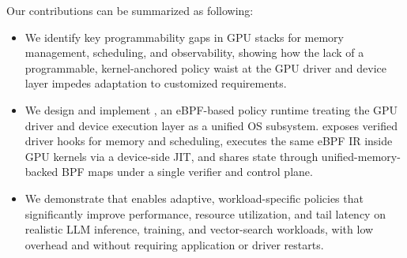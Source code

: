 Our contributions can be summarized as following:

\begin{itemize}[leftmargin=*,itemsep=0pt]
  \item We identify key programmability gaps in GPU stacks for memory management, scheduling, and observability, showing how the lack of a programmable, kernel-anchored policy waist at the GPU driver and device layer impedes adaptation to customized requirements. %
  \item We design and implement \sys, an eBPF-based policy runtime treating the GPU driver and device execution layer as a unified OS subsystem. \sys exposes verified driver hooks for memory and scheduling, executes the same eBPF IR inside GPU kernels via a device-side JIT, and shares state through unified-memory-backed BPF maps under a single verifier and control plane.
  \item We demonstrate that \sys enables adaptive, workload-specific policies that significantly improve performance, resource utilization, and tail latency on realistic LLM inference, training, and vector-search workloads, with low overhead and without requiring application or driver restarts.
\end{itemize}
